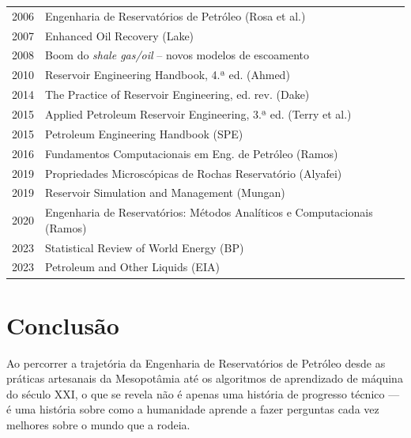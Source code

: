 \documentclass[
  12pt,
  a4paper,
  oneside,
  brazilian,
  sumario=tradicional
]{abntex2}
\begin{document}
\begin{longtable}{p{1.8cm} p{5.0cm} p{5.2cm}}
2006       & Engenharia de Reservatórios de Petróleo (Rosa et al.) & \cite{rosa2006} \\
2007       & Enhanced Oil Recovery (Lake) & \cite{lake2007} \\
2008       & Boom do \textit{shale gas/oil} -- novos modelos de escoamento & \cite{javadpour2009} \\
2010       & Reservoir Engineering Handbook, 4.ª ed. (Ahmed) & \cite{ahmed2010} \\
2014       & The Practice of Reservoir Engineering, ed. rev. (Dake) & \cite{dake2014} \\
2015       & Applied Petroleum Reservoir Engineering, 3.ª ed. (Terry et al.) & \cite{terry2015} \\
2015       & Petroleum Engineering Handbook (SPE) & \cite{spe2015} \\
2016       & Fundamentos Computacionais em Eng. de Petróleo (Ramos) & \cite{ramos2016} \\
2019       & Propriedades Microscópicas de Rochas Reservatório (Alyafei) & \cite{alyafei2019} \\
2019       & Reservoir Simulation and Management (Mungan) & \cite{mungan2019} \\
2020       & Engenharia de Reservatórios: Métodos Analíticos e Computacionais (Ramos) & \cite{ramos2020} \\
2023       & Statistical Review of World Energy (BP) & \cite{bp2023} \\
2023       & Petroleum and Other Liquids (EIA) & \cite{eia2023} \\
\end{longtable}

\chapter{Conclusão}
\label{chap:conclusao}

Ao percorrer a trajetória da Engenharia de Reservatórios de Petróleo
desde as práticas artesanais da Mesopotâmia até os algoritmos de
aprendizado de máquina do século XXI, o que se revela não é apenas
uma história de progresso técnico — é uma história sobre como a
humanidade aprende a fazer perguntas cada vez melhores sobre o mundo
que a rodeia.
\end{document}
